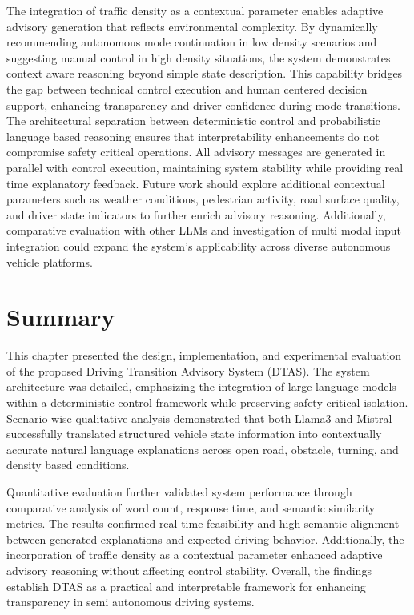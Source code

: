\documentclass[a4paper,12pt,one side]{report}
\theoremstyle{definition}
\begin{document}
\begin{itemize}
The integration of traffic density as a contextual parameter enables adaptive advisory generation that reflects environmental complexity. By dynamically recommending autonomous mode continuation in low density scenarios and suggesting manual control in high density situations, the system demonstrates context aware reasoning beyond simple state description. This capability bridges the gap between technical control execution and human centered decision support, enhancing transparency and driver confidence during mode transitions. The architectural separation between deterministic control and probabilistic language based reasoning ensures that interpretability enhancements do not compromise safety critical operations. All advisory messages are generated in parallel with control execution, maintaining system stability while providing real time explanatory feedback. Future work should explore additional contextual parameters such as weather conditions, pedestrian activity, road surface quality, and driver state indicators to further enrich advisory reasoning. Additionally, comparative evaluation with other LLMs and investigation of multi modal input integration could expand the system's applicability across diverse autonomous vehicle platforms.

\section{Summary}

This chapter presented the design, implementation, and experimental evaluation of the proposed Driving Transition Advisory System (DTAS). The system architecture was detailed, emphasizing the integration of large language models within a deterministic control framework while preserving safety critical isolation. Scenario wise qualitative analysis demonstrated that both Llama3 and Mistral successfully translated structured vehicle state information into contextually accurate natural language explanations across open road, obstacle, turning, and density based conditions.

Quantitative evaluation further validated system performance through comparative analysis of word count, response time, and semantic similarity metrics. The results confirmed real time feasibility and high semantic alignment between generated explanations and expected driving behavior. Additionally, the incorporation of traffic density as a contextual parameter enhanced adaptive advisory reasoning without affecting control stability. Overall, the findings establish DTAS as a practical and interpretable framework for enhancing transparency \cite{fernandez2021trustworthy} in semi autonomous driving systems.

\end{itemize}
\end{document}
